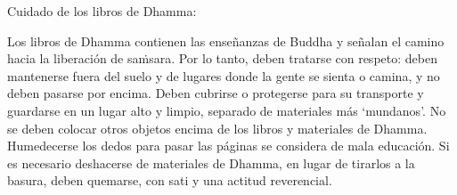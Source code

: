 
\thispagestyle{empty}

\newlength\ackWidth
\ifaivedition
\setlength{\ackWidth}{0.77\linewidth}
\else
\setlength{\ackWidth}{0.8\linewidth}
\fi

{\centering

\ifaivedition
\vspace*{9\baselineskip}
\else
\vspace*{6\baselineskip}
\fi

\begin{minipage}{\ackWidth}
\setlength{\parskip}{8pt}

{\instructionFont\color{instruction}Cuidado de los libros de Dhamma:}

\bigskip

Los libros de Dhamma contienen las enseñanzas de Buddha y señalan el camino hacia la liberación de saṁsara. Por lo tanto, deben tratarse con respeto: deben mantenerse fuera del suelo y de lugares donde la gente se sienta o camina, y no deben pasarse por encima. Deben cubrirse o protegerse para su transporte y guardarse en un lugar alto y limpio, separado de materiales más ‘mundanos’. No se deben colocar otros objetos encima de los libros y materiales de Dhamma. Humedecerse los dedos para pasar las páginas se considera de mala educación. Si es necesario deshacerse de materiales de Dhamma, en lugar de tirarlos a la basura, deben quemarse, con sati y una actitud reverencial.

\end{minipage}

}

